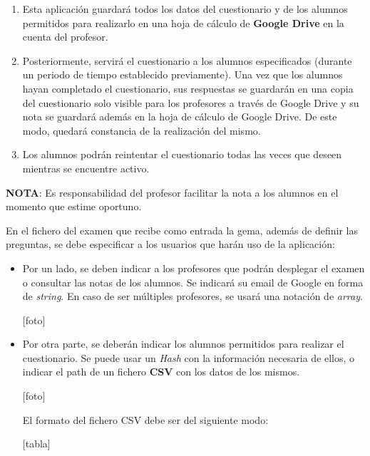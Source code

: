 \begin{enumerate}
  \item Esta aplicaci\'on guardar\'a todos los datos del cuestionario y de los alumnos permitidos para realizarlo en una hoja de c\'alculo de {\bfseries Google Drive}
  en la cuenta del profesor.

\item Posteriormente, servir\'a el cuestionario a los alumnos especificados (durante un periodo de tiempo establecido previamente). Una vez que los alumnos hayan
  completado el cuestionario, sus respuestas se guardar\'an en una copia del cuestionario solo visible para los profesores a trav\'es de Google Drive y su
  nota se guardar\'a adem\'as en la hoja de c\'alculo de Google Drive. De este modo, quedar\'a constancia de la realizaci\'on del mismo.
  \bigskip

\item Los alumnos podr\'an reintentar el cuestionario todas las veces que deseen mientras se encuentre activo.

\end{enumerate}

{\bfseries NOTA}: Es responsabilidad del profesor facilitar la nota a los alumnos en el momento que estime oportuno.
\bigskip

En el fichero del examen que recibe como entrada la gema, adem\'as de definir las preguntas, se debe especificar a los usuarios que har\'an
uso de la aplicaci\'on:

\begin{itemize}
  \item Por un lado, se deben indicar a los profesores que podr\'an desplegar el examen o consultar las notas de los alumnos. Se indicar\'a
  su email de Google en forma de \textit{string}. En caso de ser m\'ultiples profesores, se usar\'a una notaci\'on de \textit{array}.
  
  [foto]
  
  \item Por otra parte, se deber\'an indicar los alumnos permitidos para realizar el cuestionario. Se puede usar un \textit{Hash} con 
  la informaci\'on necesaria de ellos, o indicar el path de un fichero {\bfseries CSV} con los datos de los mismos.
  
  [foto]
  \bigskip
  
  El formato del fichero CSV debe ser del siguiente modo:
  
  [tabla]
  
\end{itemize}

